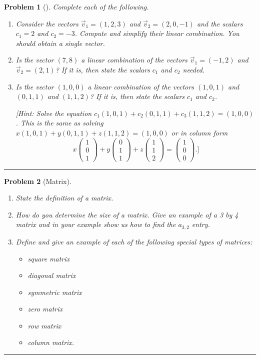 \documentclass[letterpaper,oneside]{book}%
\theoremstyle{plain}
\theoremstyle{box}
\theoremstyle{problem}
\newtheorem{problemnum}{Problem}[chapter]
\newenvironment{problem}[1][]{\begin{problemnum}[#1]}{\end{problemnum}\nopagebreak\hrule\bigskip}
\newcommand{\pvec}[1]{\begin{pmatrix} #1 \end{pmatrix}}
\begin{document}
\begin{problem}
 Complete each of the following.
\begin{enumerate}
 \item Consider the vectors $\vec v_1 = (1,2,3)$ and $\vec v_2= (2,0,-1)$ and the scalars $c_1=2$ and $c_2=-3$.  Compute and simplify their linear combination. You should obtain a single vector.
 \item Is the vector $(7,8)$ a linear combination of the vectors $\vec v_1 = (-1,2)$ and $\vec v_2=(2,1)$? If it is, then state the scalars $c_1$ and $c_2$ needed. 
 \item Is the vector $(1,0,0)$ a linear combination of the vectors $(1,0,1)$ and $(0,1,1)$ and $(1,1,2)$?  If it is, then state the scalars $c_1$ and $c_2$. 

[Hint: Solve the equation $c_1(1,0,1) + c_2(0,1,1)+c_3(1,1,2) = (1,0,0)$.  This is the same as solving
$x(1,0,1) + y(0,1,1)+z(1,1,2) = (1,0,0)$
or in column form 
$$x\pvec{1\\0\\1} + y\pvec{0\\1\\1}+z\pvec{1\\1\\2} = \pvec{1\\0\\0}.]$$
\end{enumerate}

\end{problem}




\begin{problem}[Matrix]
 
\begin{enumerate}
  \item State the definition of a matrix.
  \item How do you determine the size of a matrix.  Give an example of a 3 by 4 matrix and in your example show us how to find the $a_{3,2}$ entry. 
  \item Define and give an example of each of the following special types of matrices: 
\begin{multicols}{3}
\begin{itemize}
 \item square matrix
 \item diagonal matrix 
 \item symmetric matrix 
 \item zero matrix 
 \item row matrix
 \item column matrix.
\end{itemize}
 \end{multicols}
 \end{enumerate}

\end{problem}
\end{document}
